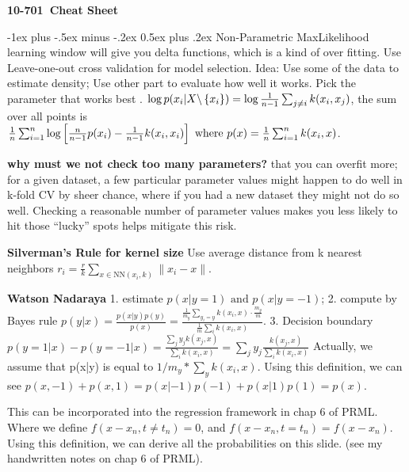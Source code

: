 \documentclass[10pt,landscape]{article}
\makeatletter
\renewcommand{\section}{\@startsection{section}{1}{0mm}%
                                {-1ex plus -.5ex minus -.2ex}%
                                {0.5ex plus .2ex}%
                                {\normalfont\large\bfseries}}
\makeatother
\begin{document}
\raggedright
\footnotesize
\begin{multicols}{3}


\setlength{\premulticols}{1pt}
\setlength{\postmulticols}{1pt}
\setlength{\multicolsep}{1pt}
\setlength{\columnsep}{2pt}

\begin{center}
     \Large{\textbf{10-701\ Cheat Sheet}} \\
\end{center}

\section{Non-Parametric}
MaxLikelihood learning window will give you delta functions, which is a kind of over fitting. Use Leave-one-out cross validation for model selection. Idea: Use some of the data to estimate density; Use other part to evaluate how well it works. Pick the parameter that works best .
$\log p(x_i|X\backslash\cbr{x_i}) = \log \frac{1}{n-1} \sum_{j \neq i} k(x_i, x_j)$, the sum over all points is $\frac{1}{n} \sum_{i=1}^n \log \sbr{\frac{n}{n-1} p(x_i) - \frac{1}{n-1} k(x_i, x_i)} \text{ where } p(x) = \frac{1}{n} \sum_{i=1}^n k(x_i, x)$.

\textbf{why must we not check too many parameters?} that you can overfit more; for a given dataset, a few particular parameter values might happen to do well in k-fold CV by sheer chance, where if you had a new dataset they might not do so well. Checking a reasonable number of parameter values makes you less likely to hit those ``lucky'' spots helps mitigate this risk.

\textbf{Silverman's Rule for kernel size} Use average distance from k nearest neighbors $r_i = \frac{r}{k} \sum_{x \in \mathrm{NN}(x_i, k)} \|x_i - x\|$.

\textbf{Watson Nadaraya} 1. estimate $p(x|y=1) \text{ and } p(x|y=-1)$; 2. compute by Bayes rule $p(y|x) = \frac{p(x|y) p(y)}{p(x)} =  \frac{\frac{1}{m_y} \sum_{y_i = y} k(x_i, x) \cdot \frac{m_y}{m}}  {\frac{1}{m} \sum_i k(x_i, x)}$. 3. Decision boundary $p(y=1|x) - p(y=-1|x) = 
  \frac{\sum_j y_j k(x_j, x)}
  {\sum_i k(x_i, x)} =
\sum_j y_j \frac{k(x_j,x)}{\sum_i k(x_i, x)}$ Actually, we assume that p(x|y) is equal to $1/m_y * \sum_y k(x_i,x)$. Using this definition, we can see $p(x,-1) + p(x,1) = p(x|-1)p(-1)+p(x|1)p(1) = p(x)$.

This can be incorporated into the regression framework in chap 6 of PRML. Where we define $f(x-x_n, t\neq t_n) = 0$, and $f(x-x_n, t=t_n) = f(x-x_n)$. Using this definition, we can derive all the probabilities on this slide. (see my handwritten notes on chap 6 of PRML).


\end{multicols}
\end{document}
